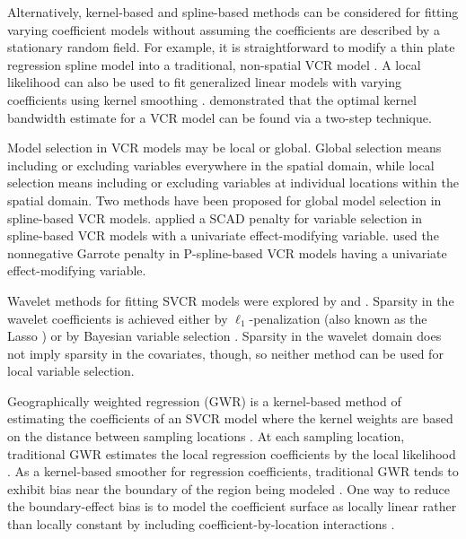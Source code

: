 \documentclass[authoryear, review, 11pt]{elsarticle}
\begin{document}
	Alternatively, kernel-based and spline-based methods can be considered for fitting varying coefficient models without assuming the coefficients are described by a stationary random field. For example, it is straightforward to modify a thin plate regression spline model into a traditional, non-spatial VCR model \citep{Wood:2006}. A local likelihood can also be used to fit generalized linear models with varying coefficients using kernel smoothing \citep{Loader:1999}. \cite{Fan:1999} demonstrated that the optimal kernel bandwidth estimate for a VCR model can be found via a two-step technique.
	
	Model selection in VCR models may be local or global. Global selection means including or excluding variables everywhere in the spatial domain, while local selection means including or excluding variables at individual locations within the spatial domain. Two methods have been proposed for global model selection in spline-based VCR models. \cite{Wang:2008a} applied a SCAD penalty \citep{Fan:2001} for variable selection in spline-based VCR models with a univariate effect-modifying variable. \cite{Antoniadis:2012a} used the nonnegative Garrote penalty \citep{Breiman:1995} in P-spline-based VCR models having a univariate effect-modifying variable.
	
	Wavelet methods for fitting SVCR models were explored by \cite{Shang-2011} and \cite{Zhang-2011}. Sparsity in the wavelet coefficients is achieved either by $\ell_1$-penalization (also known as the Lasso \citep{Tibshirani:1996}) \citep{Shang-2011} or by Bayesian variable selection \citep{Zhang-2011}. Sparsity in the wavelet domain does not imply sparsity in the covariates, though, so neither method can be used for local variable selection.

	Geographically weighted regression (GWR) is a kernel-based method of estimating the coefficients of an SVCR model where the kernel weights are based on the distance between sampling locations \cite{Brundson:1998a, Fotheringham:2002}. At each sampling location, traditional GWR estimates the local regression coefficients by the local likelihood \citep{Loader:1999}. As a kernel-based smoother for regression coefficients, traditional GWR tends to exhibit bias near the boundary of the region being modeled \citep{Hastie:1993b}. One way to reduce the boundary-effect bias is to model the coefficient surface as locally linear rather than locally constant by including coefficient-by-location interactions \cite{Wang:2008b}.
	
\end{document}
